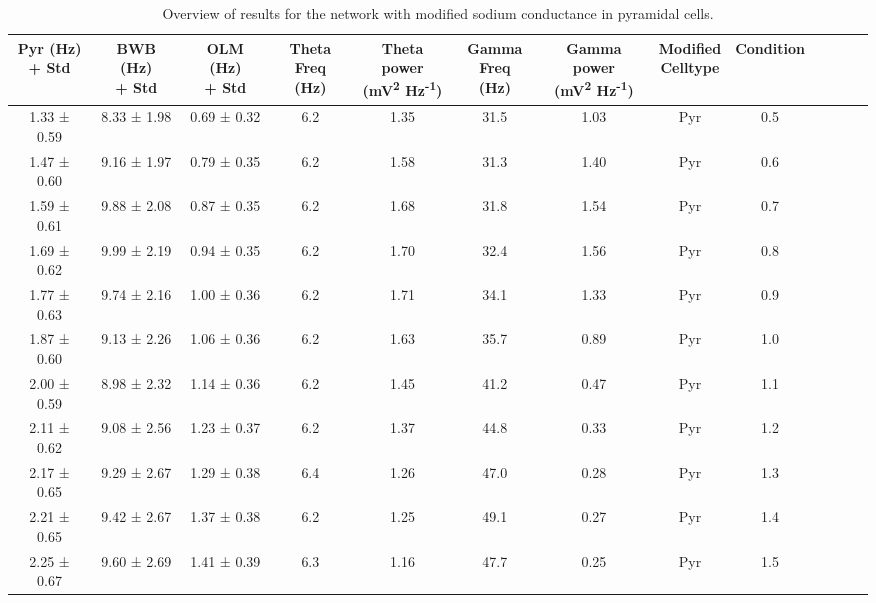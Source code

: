\begin{table}[htbp]
    \caption[Sodium variant: Pyramidal cell]{Overview of results for the network with modified sodium conductance in pyramidal cells.}\label{table:NA_variant_pyr}
    \begin{adjustbox}{width=\textwidth}
        \begin{tabular}{ccccccccccccc}
            \hline
            \CellWithForcedBreak{Pyr (Hz)                                                  \\ + Std} & \CellWithForcedBreak{BWB (Hz) \\ + Std} & \CellWithForcedBreak{OLM (Hz) \\ + Std} & \CellWithForcedBreak{Theta \\ Freq (Hz)} & \CellWithForcedBreak{Theta power \\ (mV\textsuperscript{2} Hz\textsuperscript{-1})} & \CellWithForcedBreak{Gamma \\ Freq (Hz)} & \CellWithForcedBreak{Gamma power \\ (mV\textsuperscript{2} Hz\textsuperscript{-1})} & \CellWithForcedBreak{Modified \\ Celltype} & Condition \\
            \hline
            1.33 ± 0.59 & 8.33 ± 1.98 & 0.69 ± 0.32 & 6.2 & 1.35 & 31.5 & 1.03 & Pyr & 0.5 \\
            1.47 ± 0.60 & 9.16 ± 1.97 & 0.79 ± 0.35 & 6.2 & 1.58 & 31.3 & 1.40 & Pyr & 0.6 \\
            1.59 ± 0.61 & 9.88 ± 2.08 & 0.87 ± 0.35 & 6.2 & 1.68 & 31.8 & 1.54 & Pyr & 0.7 \\
            1.69 ± 0.62 & 9.99 ± 2.19 & 0.94 ± 0.35 & 6.2 & 1.70 & 32.4 & 1.56 & Pyr & 0.8 \\
            1.77 ± 0.63 & 9.74 ± 2.16 & 1.00 ± 0.36 & 6.2 & 1.71 & 34.1 & 1.33 & Pyr & 0.9 \\
            1.87 ± 0.60 & 9.13 ± 2.26 & 1.06 ± 0.36 & 6.2 & 1.63 & 35.7 & 0.89 & Pyr & 1.0 \\
            2.00 ± 0.59 & 8.98 ± 2.32 & 1.14 ± 0.36 & 6.2 & 1.45 & 41.2 & 0.47 & Pyr & 1.1 \\
            2.11 ± 0.62 & 9.08 ± 2.56 & 1.23 ± 0.37 & 6.2 & 1.37 & 44.8 & 0.33 & Pyr & 1.2 \\
            2.17 ± 0.65 & 9.29 ± 2.67 & 1.29 ± 0.38 & 6.4 & 1.26 & 47.0 & 0.28 & Pyr & 1.3 \\
            2.21 ± 0.65 & 9.42 ± 2.67 & 1.37 ± 0.38 & 6.2 & 1.25 & 49.1 & 0.27 & Pyr & 1.4 \\
            2.25 ± 0.67 & 9.60 ± 2.69 & 1.41 ± 0.39 & 6.3 & 1.16 & 47.7 & 0.25 & Pyr & 1.5 \\
            \hline
        \end{tabular}
    \end{adjustbox}
\end{table}
